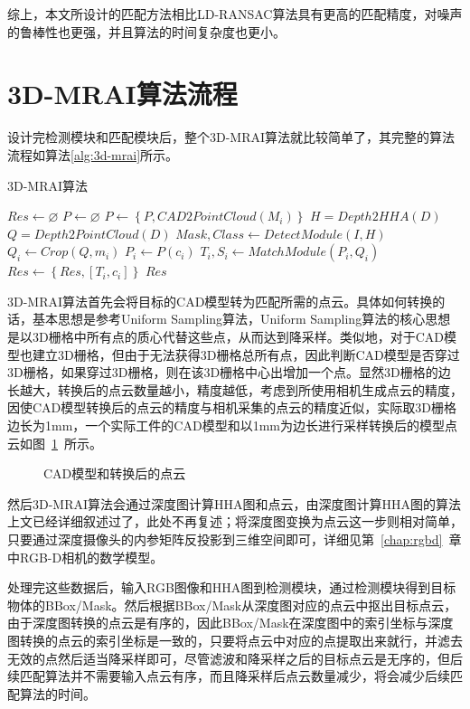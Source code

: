 综上，本文所设计的匹配方法相比LD-RANSAC算法具有更高的匹配精度，对噪声的鲁棒性也更强，并且算法的时间复杂度也更小。

\section{3D-MRAI算法流程}
设计完检测模块和匹配模块后，整个3D-MRAI算法就比较简单了，其完整的算法流程如算法\ref{alg:3d-mrai}所示。
\begin{algorithm}
  \caption{3D-MRAI算法}
  \label{alg:3d-mrai}
  $Res\leftarrow \varnothing$\;
  $P\leftarrow \varnothing$\;
   {
    $P\leftarrow \left\{P, CAD2PointCloud(M_i)\right\}$\;
  }
  $H = Depth2HHA(D)$\;
  $Q = Depth2PointCloud(D)$\;
  $Mask, Class \leftarrow DetectModule(I, H)$\;
   {
    $Q_i \leftarrow Crop(Q, m_i)$\;
    $P_i \leftarrow P(c_i)$\;
    $T_i,S_i\leftarrow MatchModule(P_i, Q_i)$\;
     {
      $Res\leftarrow \left\{Res, \left[T_i, c_i\right]\right\}$\;
    }
  }
  \Return $Res$
\end{algorithm}

3D-MRAI算法首先会将目标的CAD模型转为匹配所需的点云。具体如何转换的话，基本思想是参考Uniform Sampling算法，Uniform Sampling算法的核心思想是以3D栅格中所有点的质心代替这些点，从而达到降采样。类似地，对于CAD模型也建立3D栅格，但由于无法获得3D栅格总所有点，因此判断CAD模型是否穿过3D栅格，如果穿过3D栅格，则在该3D栅格中心出增加一个点。显然3D栅格的边长越大，转换后的点云数量越小，精度越低，考虑到所使用相机生成点云的精度，因使CAD模型转换后的点云的精度与相机采集的点云的精度近似，实际取3D栅格边长为1mm，一个实际工件的CAD模型和以1mm为边长进行采样转换后的模型点云如图~\ref{fig:model-pc}~所示。
\begin{figure}[ht]
  \centering
  \hskip1cm
  \label{fig:model-pc}
  \caption{CAD模型和转换后的点云}
\end{figure}

然后3D-MRAI算法会通过深度图计算HHA图和点云，由深度图计算HHA图的算法上文已经详细叙述过了，此处不再复述；将深度图变换为点云这一步则相对简单，只要通过深度摄像头的内参矩阵反投影到三维空间即可，详细见第~\ref{chap:rgbd}~章中RGB-D相机的数学模型。

处理完这些数据后，输入RGB图像和HHA图到检测模块，通过检测模块得到目标物体的BBox/Mask。然后根据BBox/Mask从深度图对应的点云中抠出目标点云，由于深度图转换的点云是有序的，因此BBox/Mask在深度图中的索引坐标与深度图转换的点云的索引坐标是一致的，只要将点云中对应的点提取出来就行，并滤去无效的点然后适当降采样即可，尽管滤波和降采样之后的目标点云是无序的，但后续匹配算法并不需要输入点云有序，而且降采样后点云数量减少，将会减少后续匹配算法的时间。


